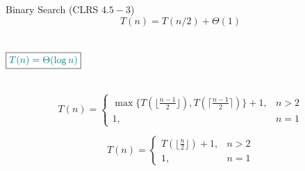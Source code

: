 
\begin{frame}{}
  \begin{exampleblock}{Binary Search (CLRS $4.5-3$)}
    \[
      T(n) = T(n/2) + \Theta(1)
    \]
  \end{exampleblock}

  \begin{columns}
      
      \[
	\boxed{\textcolor{teal}{T(n) = \Theta(\log n)}}
      \]
  \end{columns}
\end{frame}

% 
% 
% 
% 

\begin{frame}{}

  \[
    T(n) = \left\{\begin{array}{lr}
      \max\Big\{T(\lfloor \frac{n-1}{2} \rfloor), T(\lceil \frac{n-1}{2} \rceil)\Big\} + 1, & n > 2 \\
      1, & n = 1
  \end{array}\right.
  \]

  \pause
  \vspace{0.30cm}
  \[
    T(n) = \left\{\begin{array}{lr}
      T(\lfloor \frac{n}{2} \rfloor) + 1, & n > 2 \\
      1, & n = 1
    \end{array}\right.
  \]
\end{frame}


